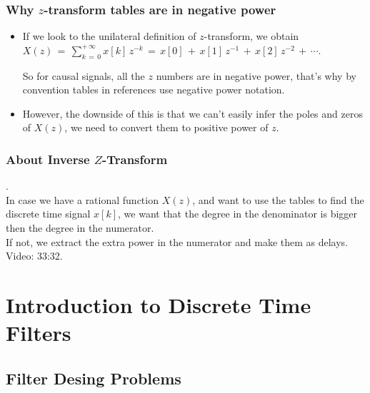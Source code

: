 \documentclass[12pt,a4paper]{book}
\begin{document}
\subsection{Why $z$-transform tables are in negative power}


\begin{itemize}
\item  If we look to the unilateral definition of $z$-transform, we obtain $X(z) \, = \,  \displaystyle\sum_{k \, = \, 0}^{+ \, \infty} x[k] \, z^{-k} \, = \, x[0] \, + \, x[1] \, z^{-1} \, + \, x[2] \, z^{-2} \, + \, \cdots$.

So for causal signals, all the $z$ numbers are in negative power, that's why by convention tables in references use negative power notation.\\
    
    
\item However, the downside of this is that we can't easily infer the poles and zeros of $X(z)$, we need to convert them to positive power of $z$.

\end{itemize}


\subsection{About Inverse $Z$-Transform}

.\\

In case we have a rational function $X(z)$, and want to use the tables to find the discrete time signal $x[k]$, we want that the degree in the denominator is bigger then the degree in the numerator.\\

If not, we extract the extra power in the numerator and make them as delays.\\

Video: 33:32.



\chapter{Introduction to Discrete Time Filters}



\section{Filter Desing Problems}
\end{document}

